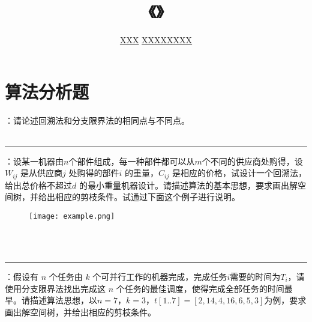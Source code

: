 \documentclass[UTF8,16pt]{article} %
\title{《\heiti{算法设计与分析}》\heiti{第{\color{red}5}次作业}}
\author{\kaishu{姓名：}\underline{XXX} \quad\quad\quad\quad\quad  \kaishu{学号：}\underline{XXXXXXXX}}
\date{}
\begin{document}
	
\maketitle
\vbox{} %

\section*{\textbf{算法分析题}}
：请论述回溯法和分支限界法的相同点与不同点。\\
{}\\
\rule[0pt]{14.3cm}{0.05em}

\vbox{} %
：设某一机器由$n$个部件组成，每一种部件都可以从$m$个不同的供应商处购得，设$W_{ij}$ 是从供应商$j$ 处购得的部件$i$ 的重量，$C_{ij}$ 是相应的价格，试设计一个回溯法，给出总价格不超过$d$ 的最小重量机器设计。请描述算法的基本思想，要求画出解空间树，并给出相应的剪枝条件。试通过下面这个例子进行说明。
\begin{figure}[htbp]
	\centering
	\texttt{[image: example.png]}
\end{figure}\\
{}\\
\rule[0pt]{14.3cm}{0.05em}

\vbox{} %
：假设有 $n$ 个任务由 $k$ 个可并行工作的机器完成，完成任务$i$需要的时间为$T_{i}$，请使用分支限界法找出完成这 $n$ 个任务的最佳调度，使得完成全部任务的时间最早。请描述算法思想，以$n=7$，$k=3$，$t[1..7]= [2,14, 4,16, 6,5,3]$为例，要求画出解空间树，并给出相应的剪枝条件。\\
{}\\
\vbox{} %
\end{document}
